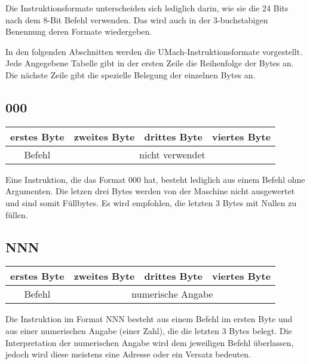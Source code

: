 Die Instruktionsformate unterscheiden sich lediglich darin, wie sie die 24 Bits
nach dem 8-Bit \gls{Befehl} verwenden. Das wird auch in der 3-buchstabigen
Benennung deren Formate wiedergeben.

In den folgenden Abschnitten werden die UMach-Instruktionsformate vorgestellt.
Jede Angegebene Tabelle gibt in der ersten Zeile die Reihenfolge der Bytes an. 
Die nächste Zeile gibt die spezielle Belegung der einzelnen Bytes an.



\subsection{000}

\begin{center}
  \begin{tabular}{|*{4}{c|}} \hline
    erstes Byte & zweites Byte  & drittes Byte  & viertes Byte \\\hline\hline
    Befehl      & \multicolumn{3}{c|}{nicht verwendet}         \\\hline
  \end{tabular}
\end{center}

Eine Instruktion, die das Format 000 hat, besteht lediglich aus einem Befehl
ohne Argumenten. Die letzen drei Bytes werden von der Maschine nicht
ausgewertet und sind somit Füllbytes. Es wird empfohlen, die letzten 3 Bytes mit
Nullen zu füllen.




\subsection{NNN}

\begin{center}
  \begin{tabular}{|*{4}{c|}}
    \hline
    erstes Byte  & zweites Byte  & drittes Byte  & viertes Byte \\\hline\hline
    Befehl       & \multicolumn{3}{c|}{numerische Angabe}       \\\hline
  \end{tabular}
\end{center}

Die Instruktion im Format NNN besteht aus einem Befehl im ersten Byte und aus
einer numerischen Angabe (einer Zahl), die die letzten 3 Bytes belegt.
Die Interpretation der numerischen Angabe wird dem jeweiligen Befehl überlassen,
jedoch wird diese meistens eine Adresse oder ein Versatz bedeuten.


